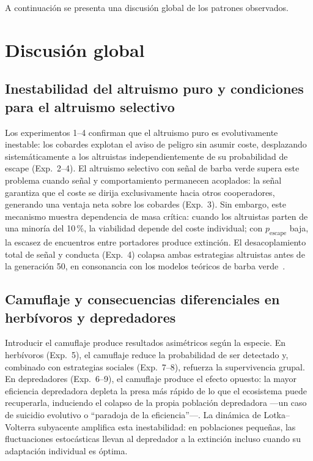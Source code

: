 \documentclass[11pt,a4paper]{article}
\begin{document}
A continuaci\'on se presenta una discusi\'on global de los patrones observados.

\section{Discusi\'on global}

\subsection{Inestabilidad del altruismo puro y condiciones para el altruismo selectivo}

Los experimentos 1--4 confirman que el altruismo puro es evolutivamente inestable: los cobardes explotan el aviso de peligro sin asumir coste, desplazando sistem\'aticamente a los altruistas independientemente de su probabilidad de escape (Exp.~2--4). El altruismo selectivo con se\~nal de barba verde supera este problema cuando se\~nal y comportamiento permanecen acoplados: la se\~nal garantiza que el coste se dirija exclusivamente hacia otros cooperadores, generando una ventaja neta sobre los cobardes (Exp.~3). Sin embargo, este mecanismo muestra dependencia de masa cr\'itica: cuando los altruistas parten de una minor\'ia del 10\,\%, la viabilidad depende del coste individual; con $p_\text{escape}$ baja, la escasez de encuentros entre portadores produce extinci\'on. El desacoplamiento total de se\~nal y conducta (Exp.~4) colapsa ambas estrategias altruistas antes de la generaci\'on 50, en consonancia con los modelos te\'oricos de barba verde~\cite{zahavi1975}.


\subsection{Camuflaje y consecuencias diferenciales en herb\'ivoros y depredadores}

Introducir el camuflaje produce resultados asim\'etricos seg\'un la especie. En herb\'ivoros (Exp.~5), el camuflaje reduce la probabilidad de ser detectado y, combinado con estrategias sociales (Exp.~7--8), refuerza la supervivencia grupal. En depredadores (Exp.~6--9), el camuflaje produce el efecto opuesto: la mayor eficiencia depredadora depleta la presa m\'as r\'apido de lo que el ecosistema puede recuperarla, induciendo el colapso de la propia poblaci\'on depredadora ---un caso de suicidio evolutivo o ``paradoja de la eficiencia''---. La din\'amica de Lotka--Volterra subyacente amplifica esta inestabilidad: en poblaciones peque\~nas, las fluctuaciones estoc\'asticas llevan al depredador a la extinci\'on incluso cuando su adaptaci\'on individual es \'optima.
\end{document}
